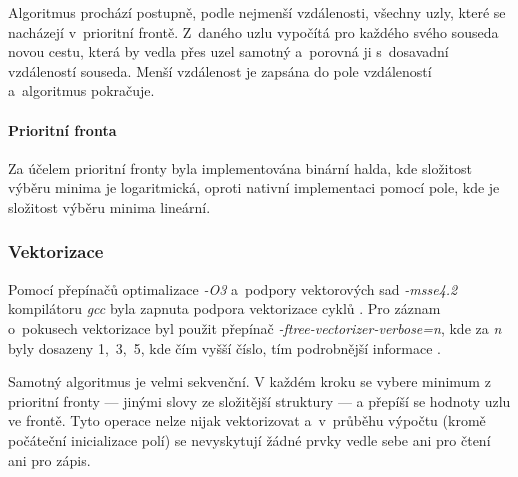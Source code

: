 Algoritmus prochází postupně, podle nejmenší vzdálenosti, všechny uzly, které se nacházejí v~prioritní frontě. Z~daného uzlu vypočítá pro každého svého souseda novou cestu, která by vedla přes uzel samotný a~porovná ji s~dosavadní vzdáleností souseda. Menší vzdálenost je zapsána do pole vzdáleností a~algoritmus pokračuje.

\paragraph{Prioritní fronta} \label{l:dij:fron}
Za účelem prioritní fronty byla implementována binární halda, kde složitost výběru minima je logaritmická, oproti nativní implementaci pomocí pole, kde je složitost výběru minima lineární.


\subsubsection{Vektorizace}
Pomocí přepínačů optimalizace \textit{-O3} a~podpory vektorových sad \textit{-msse4.2} kompilátoru \textit{gcc} byla zapnuta podpora vektorizace cyklů \cite{w:vect}. Pro záznam o~pokusech vektorizace byl použit přepínač \textit{-ftree-vectorizer-verbose=n}, kde za \textit{n} byly dosazeny 1,~3,~5, kde čím vyšší číslo, tím podrobnější informace \cite{w:vect}.\textbf{}

Samotný algoritmus je velmi sekvenční. V každém kroku se vybere minimum z prioritní fronty --- jinými slovy ze složitější struktury --- a přepíší se hodnoty uzlu ve frontě. Tyto operace nelze nijak vektorizovat a~v~průběhu výpočtu (kromě počáteční inicializace polí) se nevyskytují žádné prvky vedle sebe ani pro čtení ani pro zápis.

